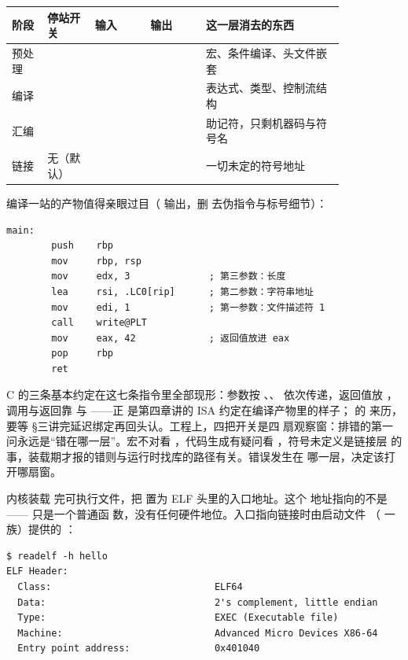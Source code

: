\begin{longtable}{L{0.09\linewidth}L{0.12\linewidth}L{0.14\linewidth}L{0.14\linewidth}L{0.35\linewidth}}
\toprule
阶段 & 停站开关 & 输入 & 输出 & 这一层消去的东西 \\
\midrule
预处理 &  &  &  & 宏、条件编译、头文件嵌套 \\
编译 &  &  &  & 表达式、类型、控制流结构 \\
汇编 &  &  &  & 助记符，只剩机器码与符号名 \\
链接 & 无（默认） &  &  & 一切未定的符号地址 \\
\bottomrule
\end{longtable}

编译一站的产物值得亲眼过目（ 输出，删
去伪指令与标号细节）：

\begin{lstlisting}
main:
        push    rbp
        mov     rbp, rsp
        mov     edx, 3              ; 第三参数：长度
        lea     rsi, .LC0[rip]      ; 第二参数：字符串地址
        mov     edi, 1              ; 第一参数：文件描述符 1
        call    write@PLT
        mov     eax, 42             ; 返回值放进 eax
        pop     rbp
        ret
\end{lstlisting}

C 的三条基本约定在这七条指令里全部现形：参数按
、、 依次传递，返回值放
，调用与返回靠  与 ——正
是第四章讲的 ISA 约定在编译产物里的样子； 的
来历，要等 §三讲完延迟绑定再回头认。工程上，四把开关是四
扇观察窗：排错的第一问永远是“错在哪一层”。宏不对看
，代码生成有疑问看 ，符号未定义是链接层
的事，装载期才报的错则与运行时找库的路径有关。错误发生在
哪一层，决定该打开哪扇窗。

内核装载
完可执行文件，把  置为 ELF 头里的入口地址。这个
地址指向的不是 —— 只是一个普通函
数，没有任何硬件地位。入口指向链接时由启动文件
（ 一族）提供的 ：

\begin{lstlisting}
$ readelf -h hello
ELF Header:
  Class:                             ELF64
  Data:                              2's complement, little endian
  Type:                              EXEC (Executable file)
  Machine:                           Advanced Micro Devices X86-64
  Entry point address:               0x401040
\end{lstlisting}

